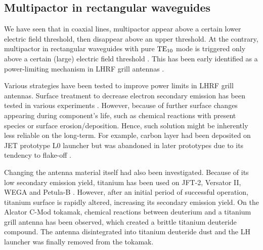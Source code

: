 \subsection{Multipactor in rectangular waveguides}\label{sec:multipactor_lhrf}




We have seen that in coaxial lines, multipactor appear above a certain lower electric field threshold, then disappear above an upper threshold. At the contrary, multipactor in rectangular waveguides with pure ${\mathrm{TE}}_{10}$ mode is triggered only above a certain (large) electric field threshold . This has been early identified as a power-limiting mechanism in LHRF grill antennas . 


Various strategies have been tested to improve power limits in LHRF grill antennas. Surface treatment to decrease electron secondary emission has been tested in various experiments . However, because of further surface changes appearing during component's life, such as chemical reactions with present species or surface erosion/deposition. Hence, such solution might be inherently less reliable on the long-term. For example, carbon layer had been deposited on JET prototype L0 launcher but was abandoned in later prototypes due to its tendency to flake-off .

Changing the antenna material itself had also been investigated. Because of its low secondary emission yield, titanium has been used on JFT-2, Versator II, WEGA and Petula-B . However, after an initial period of successful operation, titanium surface is rapidly altered, increasing its secondary emission yield. On the Alcator C-Mod tokamak, chemical reactions between deuterium and a titanium grill antenna has been observed, which created a brittle titanium deuteride compound. The antenna disintegrated into titanium deuteride dust and the LH launcher was finally removed from the tokamak. 


